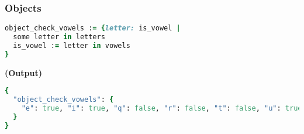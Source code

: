 \documentclass[twocolumn]{article}
\begin{document}
\vspace{-1em}
\subsubsection*{Objects}

\begin{lstlisting}[language=Ruby]
object_check_vowels := {letter: is_vowel |
  some letter in letters
  is_vowel := letter in vowels
}
\end{lstlisting}



\textbf{\tiny{(Output)}}
\begin{lstlisting}[language=Ruby]
{
  "object_check_vowels": {
    "e": true, "i": true, "q": false, "r": false, "t": false, "u": true, "w": false, "y": true
  }
}

\end{lstlisting}
\end{document}
